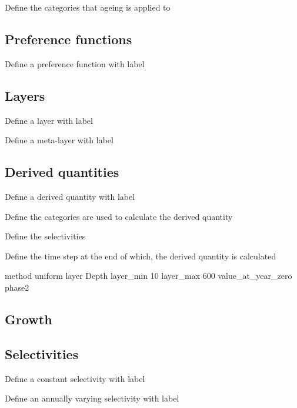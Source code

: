  {Define the categories that ageing is applied to}

\subsection{Preference functions}

 {Define a preference function with label}

\subsection{Layers}

 {Define a layer with label}

 {Define a meta-layer with label}

\subsection{Derived quantities}

 {Define a derived quantity with label}

 {Define the categories are used to calculate the derived quantity}

 {Define the selectivities}

 {Define the time step at the end of which, the derived quantity is calculated}

method uniform
layer Depth
layer\_min  10
layer\_max 600
value\_at\_year\_zero phase2


\subsection{Growth}

\subsection{Selectivities}

 {Define a constant selectivity with label}

 {Define an annually varying selectivity with label}



